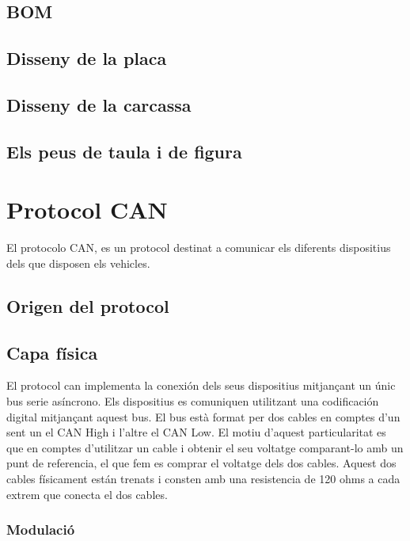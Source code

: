 \documentclass{tfgitic}[2024/07/01]
\begin{document}
\section{BOM}

\section{Disseny de la placa}

\section{Disseny de la carcassa}



\section{Els peus de taula i de figura}

\chapter{Protocol CAN}

El protocolo CAN, es un protocol destinat a comunicar els diferents dispositius dels que disposen els vehicles.

\section{Origen del protocol}

\section{Capa física}

El protocol can implementa la conexión dels seus dispositius mitjançant un únic bus serie asíncrono.  
Els dispositius es comuniquen utilitzant una codificación digital mitjançant aquest bus. El bus està 
format per dos cables en comptes d’un sent un el CAN High i l’altre el CAN Low. El motiu d’aquest 
particularitat es que en comptes d’utilitzar un cable i obtenir el seu voltatge comparant-lo amb un 
punt de referencia, el que fem es comprar el voltatge dels dos cables. Aquest dos cables físicament 
están trenats i consten amb una resistencia de 120 ohms a cada extrem que conecta el dos cables.

\subsection*{Modulació}
\end{document}
